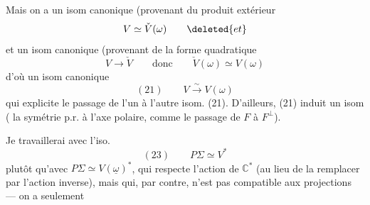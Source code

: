 Mais on a un isom canonique (provenant du produit extérieur
\[
V\simeq\check V(\omega)\qquad\deleted{et}
\]
et un isom canonique (provenant de la forme quadratique
\[
V\longrightarrow\check V\qquad\text{donc}\qquad\check V(\omega)\simeq V(\omega)
\]
d'où un isom canonique
\[
(21)\qquad V\xrightarrow{\sim}V(\omega)
\]
qui explicite le passage de l'un à l'autre isom.  (21). D'ailleurs, (21) induit  un isom
( la  symétrie p.r. à l'axe polaire,   comme le passage de $F$ à $F^\perp$). 


Je travaillerai  avec l'iso.
\[
(23)\qquad P\Sigma\simeq V^*
\]
plutôt qu'avec $P\Sigma\simeq V(\underline\omega)^*$,  qui respecte l'action de $\mathbb C^*$  (au lieu de la remplacer par l'action inverse), mais qui, par contre, n'est pas compatible aux projections --- on a seulement 

